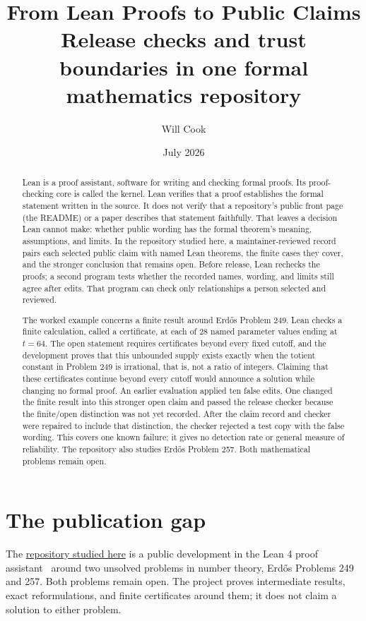 \documentclass[11pt]{article}
\title{From Lean Proofs to Public Claims\\[2pt]
{\large Release checks and trust boundaries in one formal mathematics repository}}
\author{Will Cook}
\date{July 2026}
\newcommand{\repobase}{https://github.com/wcook04/plectis-lean-erdos249-257}
\begin{document}
\maketitle

\begin{abstract}
Lean is a proof assistant, software for writing and checking formal proofs.
Its proof-checking core is called the kernel.  Lean verifies that a proof
establishes the formal statement written in the source.  It does not verify
that a repository's public front page (the README) or a paper describes that
statement faithfully.
That leaves a decision Lean cannot make: whether public wording has the formal
theorem's meaning, assumptions, and limits.  In the repository studied here, a
maintainer-reviewed record pairs each selected public claim with named Lean
theorems, the finite cases they cover, and the stronger conclusion that remains
open.  Before release, Lean rechecks the proofs; a second program tests whether
the recorded names, wording, and limits still agree after edits.  That program
can check only relationships a person selected and reviewed.

The worked example concerns a finite result around Erd\H{o}s Problem 249.
Lean checks a finite calculation, called a certificate, at each of 28 named
parameter values ending at \(t=64\).  The open statement requires certificates beyond
every fixed cutoff, and the development proves that this unbounded supply
exists exactly when the totient constant in Problem 249 is irrational, that is,
not a ratio of integers.  Claiming that these
certificates continue beyond every cutoff would announce a solution while
changing no formal proof.  An earlier evaluation applied ten false edits.  One
changed the finite result into this stronger open claim and passed the release
checker because the finite/open distinction was not yet recorded.  After the
claim record and checker were repaired to include that distinction, the
checker rejected a test copy with the false wording.  This
covers one known failure; it gives no detection rate or general measure of
reliability.  The repository also studies Erd\H{o}s Problem 257.  Both
mathematical problems remain open.
\end{abstract}

\section{The publication gap}\label{sec:gap}

The \href{\repobase}{repository studied here}
is a public development in the Lean 4 proof assistant~\cite{lean4} around two
unsolved problems in number theory,
Erd\H{o}s Problems 249 and 257.  Both problems remain open.  The project
proves intermediate results, exact reformulations, and finite certificates
around them; it does not claim a solution to either problem.
\end{document}
